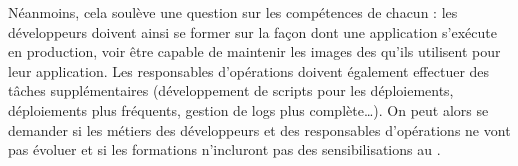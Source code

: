 Néanmoins, cela soulève une question sur les compétences de chacun : les développeurs doivent ainsi se former sur la façon dont une application s'exécute en production, voir être capable de maintenir les images des  qu'ils utilisent pour leur application. Les responsables d'opérations doivent également effectuer des tâches supplémentaires (développement de scripts pour les déploiements, déploiements plus fréquents, gestion de logs plus complète\ldots). On peut alors se demander si les métiers des développeurs et des responsables d'opérations ne vont pas évoluer et si les formations n'incluront pas des sensibilisations au \devops{}.

